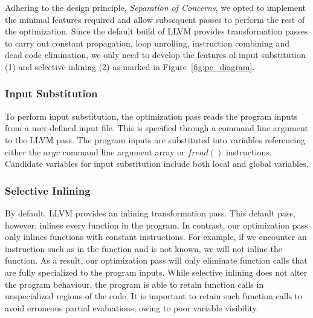 Adhering to the design principle, \textit{Separation of Concerns}, we opted to implement the minimal features required and allow subsequent passes to perform the rest of the optimization.
Since the default build of LLVM provides transformation passes to carry out constant propagation, loop unrolling, instruction combining and dead code elimination, we only need to develop the features of input substitution (1) and selective inlining (2) as marked in Figure~\ref{fig:pe_diagram}.

\subsubsection{Input Substitution}

To perform input substitution, the optimization pass reads the program inputs from a user-defined input file. 
This is specified through a command line argument to the LLVM pass. 
The program inputs are substituted into variables referencing either the $argv$ command line argument array or $fread()$ instructions.
Candidate variables for input substitution include both local and global variables.

\subsubsection{Selective Inlining}

By default, LLVM provides an inlining transformation pass.
This default pass, however, inlines every function in the program.
In contrast, our optimization pass only inlines functions with constant instructions.
For example, if we encounter an instruction such as  in the function and  is not known, we will not inline the function.
As a result, our optimization pass will only eliminate function calls that are fully specialized to the program inputs.
While selective inlining does not alter the program behaviour, the program is able to retain function calls in unspecialized regions of the code.
It is important to retain such function calls to avoid erroneous partial evaluations, owing to poor variable visibility.
